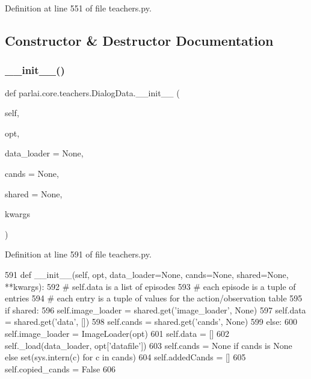 Definition at line 551 of file teachers.\+py.



\subsection{Constructor \& Destructor Documentation}
\mbox{\label{classparlai_1_1core_1_1teachers_1_1DialogData_a8c20c97b259bf583c53f47d235790813}} 
\subsubsection{\texorpdfstring{\+\_\+\+\_\+init\+\_\+\+\_\+()}{\_\_init\_\_()}}
{\footnotesize\ttfamily def parlai.\+core.\+teachers.\+Dialog\+Data.\+\_\+\+\_\+init\+\_\+\+\_\+ (\begin{DoxyParamCaption}\item[{}]{self,  }\item[{}]{opt,  }\item[{}]{data\+\_\+loader = {\ttfamily None},  }\item[{}]{cands = {\ttfamily None},  }\item[{}]{shared = {\ttfamily None},  }\item[{}]{kwargs }\end{DoxyParamCaption})}



Definition at line 591 of file teachers.\+py.


\begin{DoxyCode}
591     \textcolor{keyword}{def }\_\_init\_\_(self, opt, data\_loader=None, cands=None, shared=None, **kwargs):
592         \textcolor{comment}{# self.data is a list of episodes}
593         \textcolor{comment}{# each episode is a tuple of entries}
594         \textcolor{comment}{# each entry is a tuple of values for the action/observation table}
595         \textcolor{keywordflow}{if} shared:
596             self.image\_loader = shared.get(\textcolor{stringliteral}{'image\_loader'}, \textcolor{keywordtype}{None})
597             self.data = shared.get(\textcolor{stringliteral}{'data'}, [])
598             self.cands = shared.get(\textcolor{stringliteral}{'cands'}, \textcolor{keywordtype}{None})
599         \textcolor{keywordflow}{else}:
600             self.image\_loader = ImageLoader(opt)
601             self.data = []
602             self.\_load(data\_loader, opt[\textcolor{stringliteral}{'datafile'}])
603             self.cands = \textcolor{keywordtype}{None} \textcolor{keywordflow}{if} cands \textcolor{keywordflow}{is} \textcolor{keywordtype}{None} \textcolor{keywordflow}{else} set(sys.intern(c) \textcolor{keywordflow}{for} c \textcolor{keywordflow}{in} cands)
604         self.addedCands = []
605         self.copied\_cands = \textcolor{keyword}{False}
606 
\end{DoxyCode}



